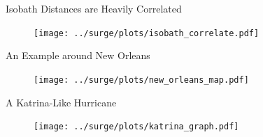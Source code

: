\begin{frame}{Isobath Distances are Heavily Correlated}
\vspace{-30pt}
\hspace{-30pt}
\begin{figure}[htb!]
    \centering
    \hspace{-35pt}\texttt{[image: ../surge/plots/isobath\_correlate.pdf]}
\end{figure}
\end{frame}

\begin{frame}{An Example around New Orleans}
\vspace{-30pt}
\begin{figure}[htb!]
    \centering
    \texttt{[image: ../surge/plots/new\_orleans\_map.pdf]}
\end{figure}
\end{frame}

\begin{frame}{A Katrina-Like Hurricane}
\vspace{-30pt}
\begin{figure}[htb!]
    \centering
    \texttt{[image: ../surge/plots/katrina\_graph.pdf]}
\end{figure}
\end{frame}
